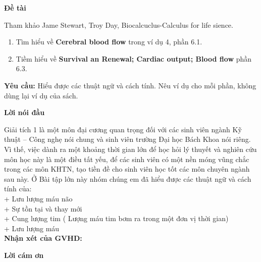 \documentclass[12pt,a4paper]{article}
\begin{document}
\begin{center}
    \textbf{Đề tài}
\end{center}

Tham khảo Jame Stewart, Troy Day, Biocalcuclus-Calculus for life sience.
    \begin{enumerate} [1.]
            \item Tìm hiểu về \textbf{Cerebral blood flow} trong ví dụ 4, phần 6.1.
            \item Tiềm hiểu về \textbf{Survival an Renewal; Cardiac output; Blood flow} phần 6.3.
    \end{enumerate}
\textbf{Yêu cầu:} Hiểu được các thuật ngữ và cách tính. Nêu ví dụ cho mỗi phần, không dùng lại ví dụ của sách.
\newpage
\begin{center}
    \textbf{Lời nói đầu}
\end{center}

    Giải tích 1 là một môn đại cương quan trọng đối với các sinh viên ngành Kỹ thuật – Công nghẹ nói chung và sinh viên trường Đại học Bách Khoa nói riêng. Vì thế, việc dành ra một khoảng thời gian lớn để học hỏi lý thuyết và nghiên cứu môn học này là một điều tất yếu, để các sinh viên có một nền móng vũng chắc trong các môn KHTN, tạo tiền đề cho sinh viên học tốt các môn chuyên ngành sau này.\newline
Ở Bài tập lớn này nhóm chúng em đã hiểu được các thuật ngữ và cách tính của:\\
+ Lưu lượng máu não\\
+ Sự tồn tại và thay mới\\
+ Cung lượng tim ( Lượng máu tim bơm ra trong một đơn vị thời gian)\\
+ Lưu lượng máu \\
\textbf{Nhận xét của GVHD:}

\newpage
\begin{center}
    \textbf{Lời cám ơn}
\end{center}

\end{document}

